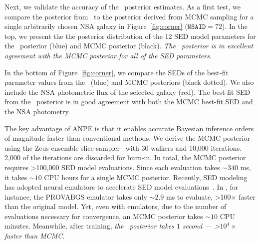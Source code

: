 Next, we validate the accuracy of the \sedflow~posterior estimates.
As a first test, we compare the posterior from \sedflow~to the posterior derived
from MCMC sampling for a single arbitrarily chosen NSA galaxy in
Figure~\ref{fig:corner} ($\mathtt{NSAID} = 72$). 
In the top, we present the the posterior distribution of the 12 SED model
parameters for the \sedflow~posterior (blue) and MCMC posterior (black). 
\emph{The \sedflow~posterior is in excellent agreement with the MCMC posterior
for all of the SED parameters}. 
 
In the bottom of Figure~\ref{fig:corner}, we compare the SEDs of the best-fit
parameter values from the \sedflow~(blue) and MCMC posteriors (black dotted). 
We also include the NSA photometric flux of the selected galaxy (red). 
The best-fit SED from the \sedflow~posterior is in good agreement with
both the MCMC best-fit SED and the NSA photometry.  

The key advantage of ANPE is that it enables accurate Bayesian inference
orders of magnitude faster than conventional methods. 
We derive the MCMC posterior using the {\sc Zeus} ensemble
slice-sampler~\citep{karamanis2020} with 30 walkers and 10,000 iterations.
2,000 of the iterations are discarded for burn-in. 
In total, the MCMC posterior requires >100,000 SED model evaluations. 
Since each evaluation takes ${\sim}340$ ms, it takes ${\sim}10$ CPU hours for a
single MCMC posterior. 
Recently, SED modeling has adopted neural emulators to accelerate SED model
evaluations~\citep{alsing2020}. 
In \cite{hahn2022}, for instance, the PROVABGS emulator takes
only ${\sim}2.9$ ms to evaluate, >100$\times$ faster than the original model. 
Yet, even with emulators, due to the number of evaluations necessary for
convergence, an MCMC posterior takes ${\sim}10$ CPU minutes. 
Meanwhile, after training, \emph{the \sedflow~posterior takes $1$ second ---
>$10^4\times$ faster than MCMC}. 

